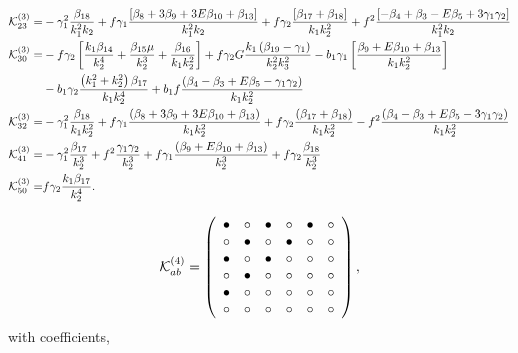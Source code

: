 \begin{align*}
\ko_{23}^{(3)}=& -\gamma_1^2 \frac{\beta_{18}}{k_1^2 k_2} + f \gamma_1 \frac{\left[ \beta_{8} + 3 \beta_{9} + 3 E \beta_{10} + \beta_{13}\right]}{k_1^2 k_2} + f \gamma_2 \frac{\left[ \beta_{17} + \beta_{18}\right]}{k_1 k_2^2} + f^2 \frac{\left[ -{\beta_{4}+\beta_{3}} - E \beta_{5} + 3 \gamma_1 \gamma_2 \right]}{k_1^2 k_2}\\
%
\ko_{30}^{(3)}=& -f \gamma_2 \left[ \frac{k_1 \beta_{14}}{k_2^4} + \frac{\beta_{15} \mu}{k_2^3} + \frac{\beta_{16}}{k_1 k_2^2} \right] + f \gamma_2 G \frac{k_1 \left(\beta_{19} - \gamma_1 \right)}{k_2^2 k_3^2} - b_1 \gamma_1 \left[ \frac{\beta_{9} + E \beta_{10} + \beta_{13}}{k_1 k_2^2}  \right] \\
&- b_1 \gamma_2 \frac{\left(k_1^2 + k_2^2\right) \beta_{17} }{k_1 k_2^4} + b_1 f \frac{\left({\beta_{4}-\beta_{3}} + E \beta_{5} - \gamma_1 \gamma_2 \right)}{k_1 k_2^2}\\
%
\ko_{32}^{(3)}=& - \gamma_1^2 \frac{\beta_{18}}{k_1 k_2^2} + f \gamma_1 \frac{\left(\beta_{8} + 3 \beta_{9} + 3 E \beta_{10} + \beta_{13} \right)}{k_1 k_2^2} + f \gamma_2 \frac{\left(\beta_{17} + \beta_{18} \right)}{k_1 k_2^2} - f^2 \frac{\left({\beta_{4}-\beta_{3}} + E \beta_{5} - 3 \gamma_1 \gamma_2 \right)}{k_1 k_2^2}\\
%
\ko_{41}^{(3)}=& - \gamma_1^2 \frac{\beta_{17}}{k_2^3} + f^2 \frac{\gamma_1 \gamma_2}{k_2^3} + f \gamma_1 \frac{\left(\beta_{9} + E \beta_{10} + \beta_{13} \right)}{k_2^3} + f \gamma_2 \frac{\beta_{18}}{k_2^3}\\
\ko_{50}^{(3)}=& f \gamma_2 \frac{k_1 \beta_{17}}{k_2^4}.
\end{align*}

\begin{equation}
	\mathcal{K}^{(4)}_{ab}= 
 \left( \begin {array}{cccccc} \bullet &\circ &\bullet &\circ 
&\bullet &\circ \\  \circ &\bullet &\circ &
\bullet &\circ &\circ \\  \bullet &\circ &
\bullet &\circ &\circ &\circ \\  \circ &
\bullet &\circ &\circ &\circ &\circ \\  
\bullet &\circ &\circ &\circ &\circ &\circ 
\\  \circ &\circ &\circ &\circ &\circ &
\circ \end {array} \right), 
\end{equation}
with coefficients, 

